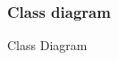 \documentclass[12pt,titlepage]{article}
\begin{document}
\begin{figure}
\subsubsection{Class diagram}\label{sec:mod1}
\centering
{}
\caption{Class Diagram}
\end{figure}
\end{document}

